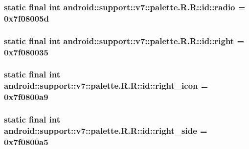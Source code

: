 \hypertarget{classandroid_1_1support_1_1v7_1_1palette_1_1_r_1_1id_809220de629c80ce61aee1a2fea2fe21}{
\subsubsection[{radio}]{\setlength{\rightskip}{0pt plus 5cm}static final int android::support::v7::palette.R.R::id::radio = 0x7f08005d}}
\label{classandroid_1_1support_1_1v7_1_1palette_1_1_r_1_1id_809220de629c80ce61aee1a2fea2fe21}


\hypertarget{classandroid_1_1support_1_1v7_1_1palette_1_1_r_1_1id_02eb85ec29dd45741292c9b926e02521}{
\subsubsection[{right}]{\setlength{\rightskip}{0pt plus 5cm}static final int android::support::v7::palette.R.R::id::right = 0x7f080035}}
\label{classandroid_1_1support_1_1v7_1_1palette_1_1_r_1_1id_02eb85ec29dd45741292c9b926e02521}


\hypertarget{classandroid_1_1support_1_1v7_1_1palette_1_1_r_1_1id_5dfb325e05ec31c1fd1c05f21143ba27}{
\subsubsection[{right\_\-icon}]{\setlength{\rightskip}{0pt plus 5cm}static final int android::support::v7::palette.R.R::id::right\_\-icon = 0x7f0800a9}}
\label{classandroid_1_1support_1_1v7_1_1palette_1_1_r_1_1id_5dfb325e05ec31c1fd1c05f21143ba27}


\hypertarget{classandroid_1_1support_1_1v7_1_1palette_1_1_r_1_1id_27487031e93f5a475f52775820dabee7}{
\subsubsection[{right\_\-side}]{\setlength{\rightskip}{0pt plus 5cm}static final int android::support::v7::palette.R.R::id::right\_\-side = 0x7f0800a5}}
\label{classandroid_1_1support_1_1v7_1_1palette_1_1_r_1_1id_27487031e93f5a475f52775820dabee7}


